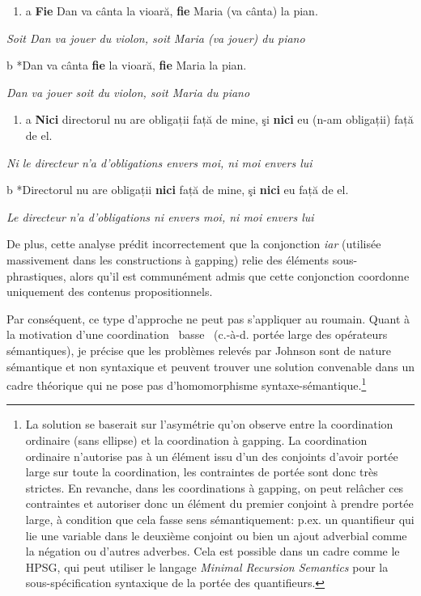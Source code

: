 \begin{enumerate}
\item \label{bkm:Ref299719793}a  \textbf{Fie} Dan va cânta la vioară, \textbf{fie} Maria (va cânta) la pian.


\end{enumerate}
{\itshape
Soit Dan va jouer du violon, soit Maria (va jouer) du piano  } 

  b  *Dan va cânta \textbf{fie} la vioară, \textbf{fie} Maria la pian.

{\itshape
Dan va jouer soit du violon, soit Maria du piano}


\begin{enumerate}
\item \label{bkm:Ref299719836}a  \textbf{Nici} directorul nu are obligații față de mine, şi \textbf{nici} eu (n-am obligații) față de el.


\end{enumerate}
{\itshape
Ni le directeur n'a d'obligations envers moi, ni moi envers lui } 

  b  *Directorul nu are obligații \textbf{nici} față de mine, şi \textbf{nici} eu față de el.

{\itshape
Le directeur n'a d'obligations ni envers moi, ni moi envers lui}

De plus, cette analyse prédit incorrectement que la conjonction \textit{iar} (utilisée massivement dans les constructions à gapping) relie des éléments sous-phrastiques, alors qu'il est communément admis que cette conjonction coordonne uniquement des contenus propositionnels. 

Par conséquent, ce type d'approche ne peut pas s'appliquer au roumain. Quant à la motivation d'une coordination {\guillemotleft}~basse~{\guillemotright} (c.-à-d. portée large des opérateurs sémantiques), je précise que les problèmes relevés par Johnson sont de nature sémantique et non syntaxique et peuvent trouver une solution convenable dans un cadre théorique qui ne pose pas d'homomorphisme syntaxe-sémantique.\footnote{La solution se baserait sur l'asymétrie qu'on observe entre la coordination ordinaire (sans ellipse) et la coordination à gapping. La coordination ordinaire n'autorise pas à un élément issu d'un des conjoints d'avoir portée large sur toute la coordination, les contraintes de portée sont donc très strictes. En revanche, dans les coordinations à gapping, on peut relâcher ces contraintes et autoriser donc un élément du premier conjoint à prendre portée large, à condition que cela fasse sens sémantiquement: p.ex. un quantifieur qui lie une variable dans le deuxième conjoint ou bien un ajout adverbial comme la négation ou d'autres adverbes. Cela est possible dans un cadre comme le HPSG, qui peut utiliser le langage \textit{Minimal Recursion Semantics} pour la sous-spécification syntaxique de la portée des quantifieurs. }  

